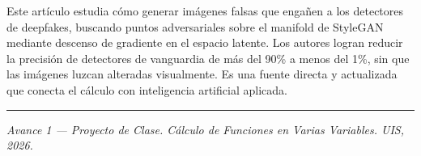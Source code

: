\documentclass[10pt,twocolumn,letterpaper]{article}
\begin{document}
	Este artículo estudia cómo generar imágenes falsas que engañen a los detectores de deepfakes, buscando puntos adversariales sobre el manifold de StyleGAN mediante descenso de gradiente en el espacio latente. Los autores logran reducir la precisión de detectores de vanguardia de más del 90\% a menos del 1\%, sin que las imágenes luzcan alteradas visualmente. Es una fuente directa y actualizada que conecta el cálculo con inteligencia artificial aplicada.
	
	\vspace{0.3cm}
	\hrule
	\vspace{0.2cm}
	{\small \textit{Avance 1 — Proyecto de Clase. Cálculo de Funciones en Varias Variables. UIS, 2026.}}
	
\end{document}
